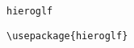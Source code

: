 \documentclass{article}
\begin{document}
\verb|hieroglf|

\verb|\usepackage{hieroglf}|

\end{document}
